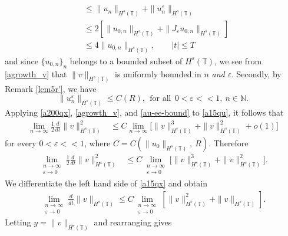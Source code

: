 \documentclass[12pt,reqno]{amsart}
\newcommand{\ci}{\mathbb{T}}
\newcommand{\ee}{\varepsilon}
\theoremstyle{plain}  %
\theoremstyle{definition}
\begin{document}
\begin{appendices}
\begin{equation}
\begin{split}
		\\
		& \le \|u_n \|_{H^s(\ci)} + \|u^\ee_n\|_{H^s(\ci)}
		\\
		& \le 2\left[ \|u_{0,n} \|_{H^s(\ci)} + \|J_\ee u_{0,n}
		\|_{H^s(\ci)} \right]
		\\
		& \le 4 \|u_{0,n} \|_{H^s(\ci)}, \qquad |t| \le T
		\label{agrowth_v}
	\end{split}
\end{equation}
and since $\{u_{0,n}\}_n$ belongs to a bounded subset of
$H^s(\ci)$, we see from \eqref{agrowth_v} that $\|v \|_{H^s(\ci)}$ is
uniformly bounded in $n$ \emph{and} $\ee$.  Secondly, by Remark \ref{lem5r'}, we have 
\begin{equation}
	\label{au-ee-bound}
	\|u^\ee_n \|_{H^s(\ci)} \le C(R), \ \ \text{for all} \ \ 0 < \ee <<1, \ n \in
	\mathbb{N}.
\end{equation}
Applying \eqref{a200qx}, \eqref{agrowth_v}, and \eqref{au-ee-bound}
to \eqref{a15qu}, it follows that 
\begin{equation*}
	\label{lim-est-in}
		\begin{split}
			\lim_{n \to \infty }
			\frac{1}{2}\frac{d}{dt}\|v\|_{H^{s}(\ci)}^2
			& \le
			C \lim_{n \to \infty} \Big [\|v\|_{H^s(\ci)}^3 +
			\|v\|_{H^s(\ci)}^2 + o(1)\Big ]
		\end{split}
	\end{equation*}
	for every $0 < \ee <<1$, where $C = C(\|u_0\|_{H^s(\ci)}, \ R)$.
	Therefore
	\begin{equation}
		\begin{split}
			\lim_{\substack{n \to \infty \\ \ee \to 0} }
			\frac{1}{2}\frac{d}{dt}\|v\|_{H^{s}(\ci)}^2
			& \le C
			\lim_{\substack{n \to \infty \\ \ee \to 0}}
			\Big [\|v\|_{H^s(\ci)}^3 + 
			\|v\|_{H^s(\ci)}^2 \Big ].
			\label{a15qx}
		\end{split}
	\end{equation}
	We differentiate the left hand side of \eqref{a15qx} and obtain
\begin{equation*}
	\begin{split}
		\lim_{\substack{n \to \infty \\ \ee \to 0}}\frac{d}{dt}
		\|v\|_{H^s(\ci)} \le C
		\lim_{\substack{n \to \infty \\ \ee \to 0}} \left [\|v\|_{H^s(\ci)}^2 +
		\|v\|_{H^s(\ci)} \right ].
	\end{split}
\end{equation*}
Letting $y = \|v\|_{H^s(\ci)}$ and rearranging gives

\end{appendices}
\end{document}
